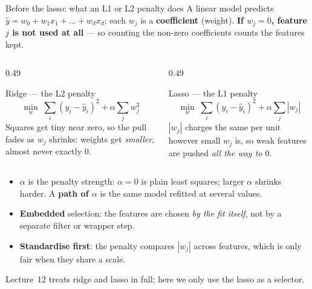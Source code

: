 \documentclass[aspectratio=169]{beamer}
\begin{document}
\begin{frame}[shrink=8]{Before the lasso: what an L1 or L2 penalty does}
  \small A linear model predicts
  $\hat y = w_0 + w_1 x_1 + \dots + w_d x_d$; each $w_j$ is a
  \textbf{coefficient} (weight). \textbf{If $w_j = 0$, feature $j$ is not used
  at all} --- so counting the non-zero coefficients counts the features kept.
  \begin{columns}[T]
    \begin{column}{0.49\textwidth}
      \begin{block}{Ridge --- the L2 penalty}
        \small
        \[ \min_w \; \sum_i (y_i - \hat y_i)^2 + \alpha \sum_j w_j^2 \]
        Squares get tiny near zero, so the pull fades as $w_j$ shrinks:
        weights get \emph{smaller}, almost never exactly $0$.
      \end{block}
    \end{column}
    \begin{column}{0.49\textwidth}
      \begin{block}{Lasso --- the L1 penalty}
        \small
        \[ \min_w \; \sum_i (y_i - \hat y_i)^2 + \alpha \sum_j |w_j| \]
        $|w_j|$ charges the same per unit however small $w_j$ is, so weak
        features are pushed \emph{all the way to $0$}.
      \end{block}
    \end{column}
  \end{columns}
  \begin{itemize}
    \item \textbf{$\alpha$} is the penalty strength: $\alpha = 0$ is plain least
      squares; larger $\alpha$ shrinks harder. A \textbf{path of $\alpha$} is
      the same model refitted at several values.
    \item \textbf{Embedded} selection: the features are chosen \emph{by the
      fit itself}, not by a separate filter or wrapper step.
    \item \textbf{Standardise first}: the penalty compares $|w_j|$ across
      features, which is only fair when they share a scale.
  \end{itemize}
  \footnotesize Lecture~12 treats ridge and lasso in full; here we only use
  the lasso as a selector.
\end{frame}
\end{document}
